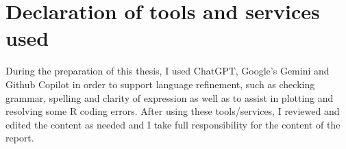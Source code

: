 \clearpage

\section{Declaration of tools and services used} \label{sec:declaration_tools_services}

During the preparation of this thesis, I used ChatGPT, Google's Gemini and Github Copilot in order to support language refinement, such as checking grammar, spelling and clarity of expression as well as to assist in plotting and resolving some R coding errors. After using these tools/services, I reviewed and edited the content as needed and I take full responsibility for the content of the report.

